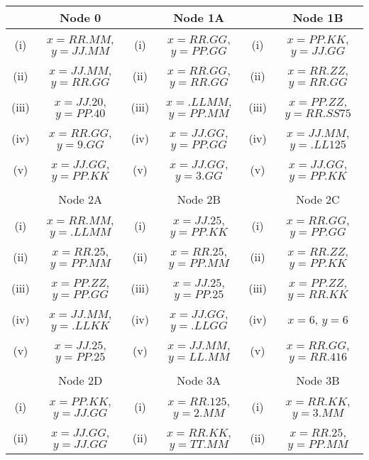 \documentclass[a4paper,12pt]{article}
\begin{document}
\newpage
	\normalsize	
	\begin{tabular}{||c|c||c|c||c|c||}
		\hline  & Node 0 &   & Node 1A &  & Node 1B     \\  \hline
		\hline (i) & $x= RR.MM$, $y= JJ.MM$ & (i) & $x= RR.GG$, $y= PP.GG$ &  (i)  & $x= PP.KK$, $y = JJ.GG$\\  \hline
		\hline (ii)  & $x= JJ.MM$, $y= RR.GG$  &  (ii) & $x= RR.GG$, $y= RR.GG$ & (ii) & $x= RR.ZZ$, $y = RR.GG $ \\  \hline
		\hline (iii) & $x= JJ.20$, $y = PP.40$  & (iii) & $x= .LLMM$, $y = PP.MM$ & (iii) & $x= PP.ZZ$, $y = RR.SS75$ \\  \hline
		\hline (iv)  & $x= RR.GG$, $y =9.GG $  &  (iv) & $x= JJ.GG$, $y = PP.GG $ & (iv)  & $x= JJ.MM$, $y= .LL125$\\  \hline
		\hline (v) & $x= JJ.GG$, $y= PP.KK$ & (v)  & $x= JJ.GG$, $y= 3.GG$ & (v) & $x= JJ.GG$, $y= PP.KK$\\  \hline & & & & & \\
		\hline 
		\hline  & Node 2A &   & Node 2B &  & Node 2C  \\  \hline
		\hline (i) & $x= RR.MM$, $y= .LLMM$ & (i)  & $x= JJ.25 $, $y = PP.KK $  & (i)  & $x= RR.GG$, $y = PP.GG$\\  \hline
		\hline (ii)  & $x= RR.25$, $y= PP.MM$  &  (ii) &$x= RR.25$, $y= PP.MM$ & (ii) & $x= RR.ZZ$, $y = PP.KK $ \\  \hline
		\hline (iii) & $x= PP.ZZ  $, $y = PP.GG $  &  (iii) &$x= JJ.25 $, $y = PP.25 $ &  (iii) & $x= PP.ZZ$, $y = RR.KK$ \\  \hline
		\hline (iv)  & $x= JJ.MM$, $y = .LLKK $  & (iv) & $x= JJ.GG $, $y = .LLGG $ & (iv)  & $x= 6$, $y = 6$\\  \hline
		\hline (v) & $x= JJ.25 $, $y = PP.25 $ & (v) & $x= JJ.MM$, $y= LL.MM$  &(v) & $x= RR.GG$, $y= RR.416$\\  \hline & & & & & \\
		\hline 
		\hline  & Node 2D &   & Node 3A &  & Node 3B   \\  \hline
		\hline (i) & $x= PP.KK$, $y= JJ.GG$ &  (i) & $x= RR.125$, $y= 2.MM$  & (i)  & $x= RR.KK$, $y= 3.MM$\\  \hline
		\hline (ii)  & $x= JJ.GG$, $y = JJ.GG$  &  (ii) & $x= RR.KK$, $y= TT.MM$ & (ii) & $x= RR.25$, $y= PP.MM$ \\  \hline

\end{tabular}
\end{document}
